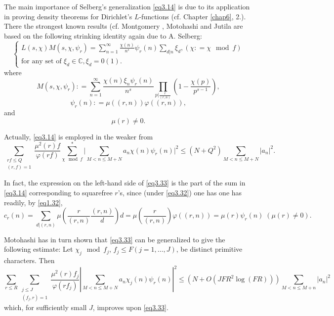 The main importance of Selberg's generalization \eqref{eq3.14} is due to its
application in proving density theorems for Dirichlet's $L$-functions
(cf. Chapter \ref{chap6}, 2.). There the strongest known results
(cf. Montgomery \cite{key8}, Motohashi \cite{key11} and Jutila
\cite{key12} are based on 
the following strinking identity again due to A. Selberg: 
\begin{equation*}
\begin{cases}
L(s,\chi) M(s,\chi,\psi_r) = \sum_{n=1}^\infty \frac{\chi(n)}{n^s}
\psi_r (n) \sum_{d|n} \xi_{d}, (\chi : = \chi\mod f)\\ 
\text{for any set of } \xi_d \in \mathbb{C}, \xi_d = 0(1).  
\end{cases}\tag{3.29} \label{eq3.29}
\end{equation*} 
where
\begin{equation*}
M(s, \chi,\psi_r) : = \sum_{n=1}^\infty \frac{\chi(n) \xi_n \psi_r
  (n)}{n^s} \prod_{p|\frac{r}{(r,n)}} (1- \frac{\chi(p)}{p^{s-1}}),
\tag{3.30}\label{eq3.30}    
\end{equation*}
\begin{equation*}
\psi_r (n) : = \mu ((r,n)) \varphi ((r,n)), \tag{3.31}\label{eq3.31}
\end{equation*}   
and
\begin{equation*}
\mu (r) \neq 0. \tag{3.32} \label{eq3.32}
\end{equation*}

Actually, \eqref{eq3.14} is employed in the weaker from
\begin{equation*}
\sum_{\substack{rf \leq Q \\ (r,f) =1}} \frac{\mu^2(r)f}{\varphi (rf)}
\sum_{\chi \mod f}^* \Big| \sum_{M < n \leq M+N} a_n \chi(n) \psi_r (n) \Big
|^2 \leq (N+Q^2) \sum_{M < n\leq M + N} \Big| a_n \Big|^2. 
\tag{3.33}\label{eq3.33}  
\end{equation*}\pageoriginale


In fact, the expression on the left-hand side of \eqref{eq3.33} is the part
of the sum in \eqref{eq3.14} corresponding to squarefree $r$'s, since (under
\eqref{eq3.32}) one has one has readily, by \eqref{eq1.32}, 
\begin{equation*}
c_r(n) = \sum_{d|(r,n)} \mu (\frac{r}{(r,n)} \frac{(r,n)}{d}) d = \mu
(\frac{r}{(r,n)}) \varphi ((r,n)) = \mu (r) \psi_r (n) \; (\mu (r) \neq
0). \tag{3.34}\label{eq3.34} 
\end{equation*}

Motohashi \cite{key14} has in turn shown that \eqref{eq3.33} can be
generalized to 
give the following estimate: Let $\chi_j \mod f_j$, $f_j \leq F (j = 1,
\ldots,J)$, be distinct primitive characters. Then 
{\fontsize{9pt}{11pt}\selectfont
\begin{equation*}
\sum_{r \leq R} \sum_{\substack{j \leq J \\ (f_j, r)=1}}  \frac{\mu^2
  (r) f_j} {\varphi (rf_j)}| \sum_{M < n \leq M + N } a_n \chi_j (n)
\psi_r (n)|^2 \leq (N+O(JFR^2 \log (FR))) \sum_{M < n \leq M
  +n}|a_n|^2 \tag{3.35}\label{eq3.35} 
\end{equation*}}\relax
which, for sufficiently small $J$, improves upon \eqref{eq3.33}.


